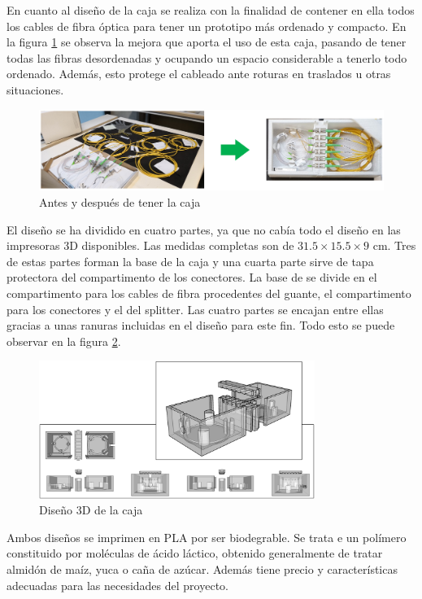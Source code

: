 \begin{itemize}
 	 	
 	En cuanto al diseño de la caja se realiza con la finalidad de contener en ella todos los cables de fibra óptica para tener un prototipo más ordenado y compacto. En la figura \ref{fig:ordenCaja} se observa la mejora que aporta el uso de esta caja, pasando de tener todas las fibras desordenadas y ocupando un espacio considerable a tenerlo todo ordenado. Además, esto protege el cableado ante roturas en traslados u otras situaciones. 
 	
	\begin{figure}[H]
	 	\centering
	 	\includegraphics[width=1\textwidth]{./img/ordenCaja}
	 	\caption{Antes y después de tener la caja} \label{fig:ordenCaja}
	\end{figure}
	 	
 	El diseño se ha dividido en cuatro partes, ya que no cabía todo el diseño en las impresoras 3D disponibles. Las medidas completas son de $31.5\times15.5\times9$ cm. Tres de estas partes forman la base de la caja y una cuarta parte sirve de tapa protectora del compartimento de los conectores. La base de se divide en el compartimento para los cables de fibra procedentes del guante, el compartimento para los conectores  y el del splitter. Las cuatro partes se encajan entre ellas gracias a unas ranuras incluidas en el diseño para este fin. Todo esto se puede observar en la figura \ref{fig:caja}.
 
  	\begin{figure}[H]
		\centering
	 	\includegraphics[width=0.8\textwidth]{./img/caja}
	 	\caption{Diseño 3D de la caja} \label{fig:caja}
	\end{figure}
 
 	Ambos diseños se imprimen en PLA por ser biodegrable. Se trata e un polímero constituido por moléculas de ácido láctico, obtenido generalmente de tratar almidón de maíz, yuca o caña de azúcar. Además tiene precio y características adecuadas para las necesidades del proyecto. \cite{bioPLA}
 	


\end{itemize}
